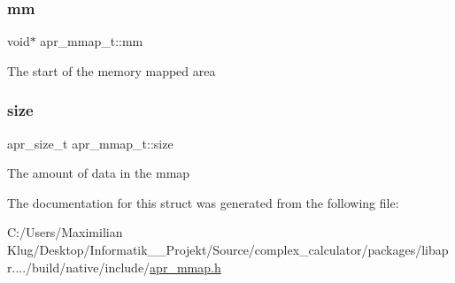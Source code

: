 \subsubsection{\texorpdfstring{mm}{mm}}
{\footnotesize\ttfamily void$\ast$ apr\+\_\+mmap\+\_\+t\+::mm}

The start of the memory mapped area \mbox{\label{structapr__mmap__t_a274aea0906a4b674e1642ac9e81966c7}} 
\subsubsection{\texorpdfstring{size}{size}}
{\footnotesize\ttfamily apr\+\_\+size\+\_\+t apr\+\_\+mmap\+\_\+t\+::size}

The amount of data in the mmap 

The documentation for this struct was generated from the following file\+:\begin{DoxyCompactItemize}
\item 
C\+:/\+Users/\+Maximilian Klug/\+Desktop/\+Informatik\+\_\+\_\+\+Projekt/\+Source/complex\+\_\+calculator/packages/libapr..../build/native/include/\mbox{\hyperlink{apr__mmap_8h}{apr\+\_\+mmap.\+h}}\end{DoxyCompactItemize}
